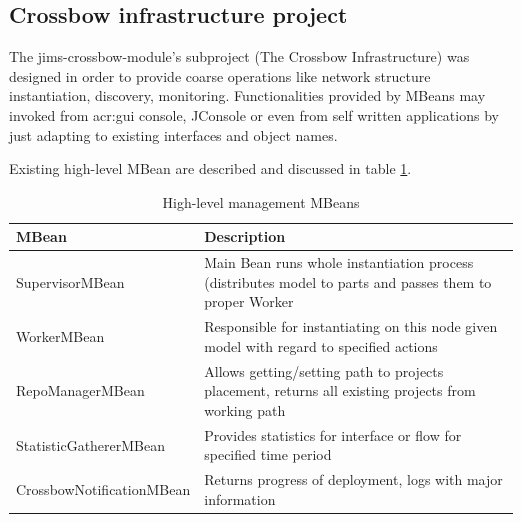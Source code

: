 \documentclass[11pt,openany]{book}
\begin{document}
      \subsection{Crossbow infrastructure project}
      \label{sec:impl:infrastructure}

        The jims-crossbow-module's subproject (The Crossbow Infrastructure) was designed in order to provide coarse
        operations like network structure instantiation, discovery, monitoring. Functionalities provided by MBeans may
        invoked from \gls{acr:gui} console, JConsole or even from self written applications by just adapting to existing
        interfaces and object names. 

        Existing high-level MBean are described and discussed in table \ref{tab:impl:hl-mbean}.

        \begin{table}[H]
          \centering

          \begin{tabularx}{\textwidth}{|l|X|}
            \hline
            MBean                     & Description                                                                      \\
            \hline \hline
            SupervisorMBean           & Main Bean runs whole instantiation process (distributes model to parts and
                                        passes them to proper Worker                                                     \\
            \hline
            WorkerMBean               & Responsible for instantiating on this node given model with regard to specified
                                        actions                                                                          \\
            \hline
            RepoManagerMBean          & Allows getting/setting path to projects placement, returns all existing projects
                                        from working path                                                                \\
            \hline
            StatisticGathererMBean    & Provides statistics for interface or flow for specified time period              \\
            \hline
            CrossbowNotificationMBean & Returns progress of deployment, logs with major information                      \\
            \hline
          \end{tabularx}

          \caption{High-level management MBeans}
          \label{tab:impl:hl-mbean}
        \end{table}
\end{document}
